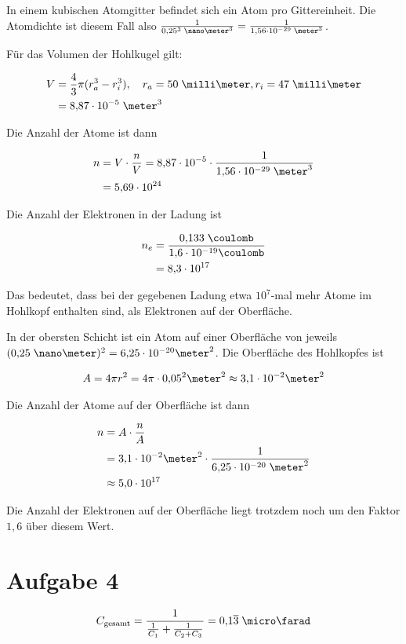 \documentclass[a4paper,german,12pt,smallheadings]{scrartcl}
\begin{document}
In einem kubischen Atomgitter befindet sich ein Atom pro Gittereinheit. Die Atomdichte ist
diesem Fall also $\frac{1}{0{,}25^3 \;\nano\meter^3} = \frac{1}{1{,}56 \cdot 10^{-29} \;\meter^3}$.

Für das Volumen der Hohlkugel gilt:

\begin{align*}
  V &= \frac{4}{3} \pi (r_a^3 - r_i^3), \quad r_a = 50 \;\milli\meter, r_i = 47\;\milli\meter \\
    &= 8{,}87 \cdot 10^{-5}\; \meter^3 \\
\end{align*}

Die Anzahl der Atome ist dann

\begin{align*}
  n &= V \cdot \frac{n}{V} = 8{,}87 \cdot 10^{-5} \cdot \frac{1}{1{,}56 \cdot 10^{-29} \;\meter^3} \\
    &= 5{,}69 \cdot 10^{24}
\end{align*}

Die Anzahl der Elektronen in der Ladung ist

\begin{align*}
  n_e &= \frac{0{,}133 \;\coulomb}{1{,}6 \cdot 10^{-19} \coulomb} \\
      &= 8{,}3 \cdot 10^{17}
\end{align*}

Das bedeutet, dass bei der gegebenen Ladung etwa $10^{7}$-mal mehr Atome im
Hohlkopf enthalten sind, als Elektronen auf der Oberfläche.


In der obersten Schicht ist ein Atom auf einer Oberfläche von jeweils $(0{,}25
\;\nano\meter)^2 = 6{,}25 \cdot 10^{-20} \meter^2$. Die Oberfläche des
Hohlkopfes ist

\begin{align*}
  A = 4 \pi r^2 = 4 \pi \cdot 0{,}05^2 \meter^2 \approx 3{,}1 \cdot 10^{-2} \meter^2
\end{align*}

Die Anzahl der Atome auf der Oberfläche ist dann

\begin{align*}
  n &= A \cdot \frac{n}{A} \\
    &= 3{,}1 \cdot 10^{-2} \meter^2 \cdot \frac{1}{6{,}25 \cdot 10^{-20} \;\meter^2} \\
    &\approx 5{,}0 \cdot 10^{17}
\end{align*}

Die Anzahl der Elektronen auf der Oberfläche liegt trotzdem noch um den Faktor
$1{,}6$ über diesem Wert.

\section*{Aufgabe 4}

\begin{align*}
  C_{\operatorname{gesamt}} = \frac{1}{\frac{1}{C_1} + \frac{1}{C_2 + C_3}} = 0{,}1\overline{3} \;\micro\farad
\end{align*}
\end{document}
